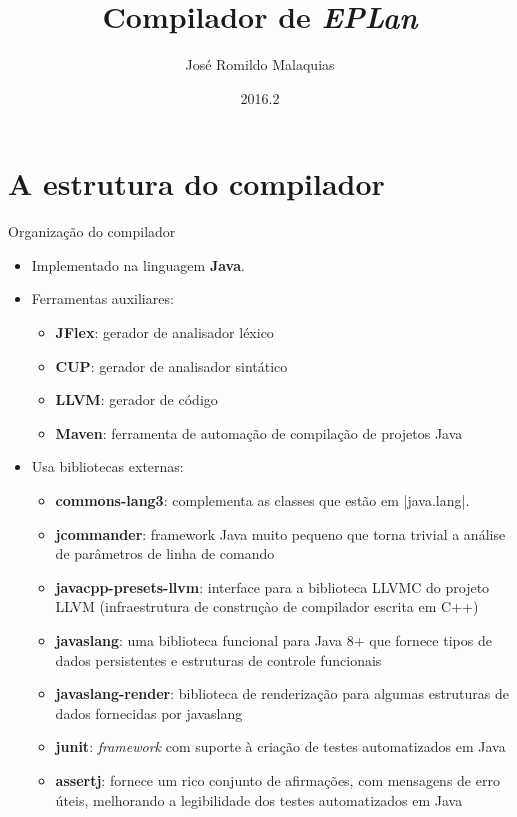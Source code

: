 \documentclass[smaller]{beamer}
\newcommand{\semester}{2016.2}
\newcommand{\lang}{\textsl{EPLan}}
\begin{document}
\title[compiler]{
  Compilador de \lang{}
}
\subject{Linguagens de Programação}
\author{José Romildo Malaquias}
\date{\semester}

\frame{\titlepage}

\frame{\tableofcontents}


\section{A estrutura do compilador}


\begin{frame}{Organização do compilador}
  \begin{itemize}
    \item Implementado na linguagem \textbf{Java}.
    \item Ferramentas auxiliares:
    \begin{itemize}
      \item \textbf{JFlex}: gerador de analisador léxico
      \item \textbf{CUP}: gerador de analisador sintático
      \item \textbf{LLVM}: gerador de código
      \item \textbf{Maven}: ferramenta de automação de compilação de
      projetos Java
    \end{itemize}
    \item Usa bibliotecas externas:
    \begin{itemize}
      \item \textbf{commons-lang3}: complementa as classes que estão
      em \pyginline|java.lang|.
      
      \item \textbf{jcommander}: framework Java muito pequeno que
      torna trivial a análise de parâmetros de linha de comando
      
      \item \textbf{javacpp-presets-llvm}: interface para a biblioteca
      LLVMC do projeto LLVM (infraestrutura de construçào de
      compilador escrita em C++)      
      
      \item \textbf{javaslang}: uma biblioteca funcional para Java 8+ que
      fornece tipos de dados persistentes e estruturas de controle
      funcionais

      \item \textbf{javaslang-render}: biblioteca de renderização para
      algumas estruturas de dados fornecidas por javaslang

      \item \textbf{junit}: \emph{framework} com suporte à criação de testes
      automatizados em Java

      \item \textbf{assertj}: fornece um rico conjunto de afirmações, com
      mensagens de erro úteis, melhorando a legibilidade dos testes
      automatizados em Java
    \end{itemize}
  \end{itemize}
\end{frame}
\end{document}
